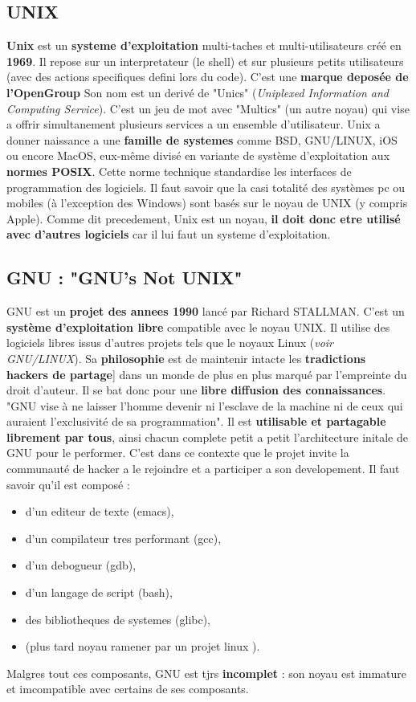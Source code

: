 \subsection{UNIX}

\textbf{Unix} est un \textbf{systeme d'exploitation} multi-taches et multi-utilisateurs créé en \textbf{1969}. Il repose sur un interpretateur (le shell) et sur plusieurs petits utilisateurs (avec des actions specifiques defini lors du code). C'est une \textbf{marque deposée de l'OpenGroup}
Son nom est un derivé de "Unics" (\textit{Uniplexed Information and Computing Service}). C'est un jeu de mot avec "Multics" (un autre noyau) qui vise a offrir simultanement plusieurs services a un ensemble d'utilisateur.
Unix a donner naissance a une \textbf{famille de systemes} comme BSD, GNU/LINUX, iOS ou encore MacOS, eux-même divisé en variante de système d'exploitation aux \textbf{normes POSIX}. Cette norme technique standardise les interfaces de programmation des logiciels. 
Il faut savoir que la casi totalité des systèmes pc ou mobiles (à l'exception des Windows) sont basés sur le noyau de UNIX (y compris Apple). 
Comme dit precedement, Unix est un noyau, \textbf{il doit donc etre utilisé avec d'autres logiciels} car il lui faut un systeme d'exploitation. \newline


\subsection{GNU : "GNU's Not UNIX"}

GNU est un \textbf{projet des annees 1990} lancé par Richard STALLMAN. C'est un \textbf{système d'exploitation libre} compatible avec le noyau UNIX. Il utilise des logiciels libres issus d'autres projets tels que le noyaux Linux (\textit{voir GNU/LINUX}). 
Sa \textbf{philosophie} est de maintenir intacte les \textbf{tradictions hackers de partage}] dans un monde de plus en plus marqué par l'empreinte du droit d'auteur. Il se bat donc pour une \textbf{libre diffusion des connaissances}. "GNU vise à ne laisser l'homme devenir ni l'esclave de la machine ni de ceux qui auraient l'exclusivité de sa programmation". 
Il est \textbf{utilisable et partagable librement par tous}, ainsi chacun complete petit a petit l'architecture initale de GNU pour le performer. C'est dans ce contexte que le projet invite la communauté de hacker a le rejoindre et a participer a son developement. 
Il faut savoir qu'il est composé : 
\begin{itemize}
	\item d'un editeur de texte (emacs),
	\item d'un compilateur tres performant (gcc),
	\item d'un debogueur (gdb), 
	\item d'un langage de script (bash),
	\item des bibliotheques de systemes (glibc),  
	\item (plus tard noyau ramener par un projet linux ). 
\end{itemize}
Malgres tout ces composants, GNU est tjrs \textbf{incomplet} : son noyau est immature et imcompatible avec certains de ses composants. \newline


